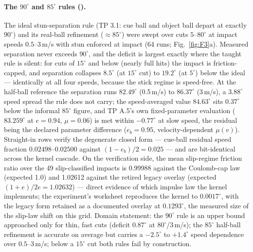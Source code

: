 \paragraph{The $90^\circ$ and $85^\circ$ rules ().}
The ideal stun-separation rule (TP 3.1: cue ball and object ball depart
at exactly $90^\circ$) and its real-ball refinement ($\approx 85^\circ$)
were swept over cuts $5$--$80^\circ$ at impact speeds $0.5$--$3$\,m/s
with stun enforced at impact (64 runs; Fig.~\ref{fig:F3}a). Measured
separation never exceeds $90^\circ$, and the deficit is largest exactly
where the taught rule is silent: for cuts of $15^\circ$ and below
(nearly full hits) the impact is friction-capped, and separation
collapses $8.5^\circ$ (at $15^\circ$ cut) to $19.2^\circ$ (at $5^\circ$)
below the ideal --- identically at all four speeds, because the stick
regime is speed-free. At the half-ball reference the separation runs
$82.49^\circ$ (0.5\,m/s) to $86.37^\circ$ (3\,m/s), a $3.88^\circ$ speed
spread the rule does not carry; the speed-averaged value $84.63^\circ$
sits $0.37^\circ$ below the informal $85^\circ$ figure, and TP A.5's own
fixed-parameter evaluation ($83.259^\circ$ at $e = 0.94$, $\mu = 0.06$)
is met within $-0.77^\circ$ at slow speed, the residual being the
declared parameter difference ($e_b = 0.95$, velocity-dependent
$\mu(v)$). Straight-in rows verify the degenerate closed form --- cue-ball
residual speed fraction $0.02498$--$0.02500$ against $(1-e_b)/2 = 0.025$
--- and are bit-identical across the kernel cascade. On the verification
side, the mean slip-regime friction ratio over the 49 slip-classified
impacts is 0.99988 against the Coulomb-cap law (expected 1.0) and
1.02612 against the retired legacy overlay (expected
$(1+e)/2e = 1.02632$) --- direct evidence of which impulse law the kernel
implements; the experiment's worksheet reproduces the kernel to
$0.0017^\circ$, with the legacy form retained as a documented overlay at
$0.1293^\circ$, the measured size of the slip-law shift on this grid. Domain statement: the $90^\circ$ rule is
an upper bound approached only for thin, fast cuts (deficit $0.87^\circ$
at $80^\circ$/3\,m/s); the $85^\circ$ half-ball refinement is accurate on
average but carries a $-2.5^\circ$ to $+1.4^\circ$ speed dependence over
$0.5$--$3$\,m/s; below a $15^\circ$ cut both rules fail by construction.

